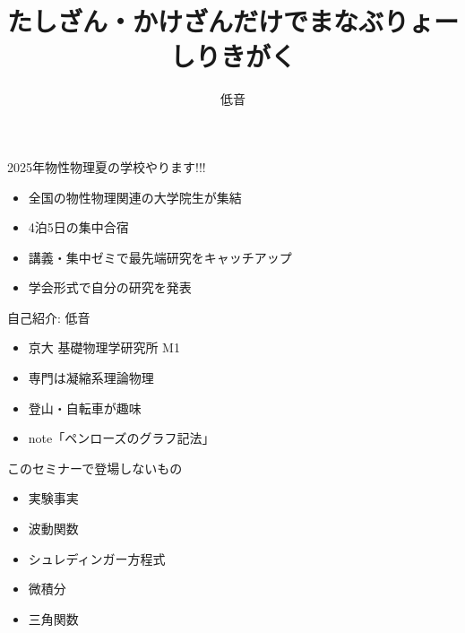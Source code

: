 \documentclass[dvipdfm]{beamer}
\title{たしざん・かけざんだけでまなぶりょーしりきがく}
\author{低音}
\begin{document}
\begin{frame}
    \titlepage
\end{frame}

\begin{frame}{2025年物性物理夏の学校やります!!!}
    \begin{itemize}
        \item 全国の物性物理関連の大学院生が集結
        \item 4泊5日の集中合宿
        \item 講義・集中ゼミで最先端研究をキャッチアップ
        \item 学会形式で自分の研究を発表
    \end{itemize}
    \textbf{}
\end{frame}

\begin{frame}{自己紹介: 低音}
    \begin{itemize}
        \item 京大 基礎物理学研究所 M1
        \item 専門は凝縮系理論物理
        \item 登山・自転車が趣味
        \item note「ペンローズのグラフ記法」
    \end{itemize}
\end{frame}

\begin{frame}{このセミナーで登場しないもの}
    \begin{itemize}
        \item 実験事実
        \item 波動関数
        \item シュレディンガー方程式
        \item 微積分
        \item 三角関数
    \end{itemize}
\end{frame}
\end{document}
